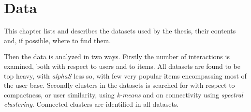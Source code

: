 
\chapter{Data}\label{cha:data}

This chapter lists and describes the datasets used by the thesis, their contents and, if possible, where to find them.

Then the data is analyzed in two ways. Firstly the number of interactions is examined, both with respect to users and to items. All datasets are found to be top heavy, with \textit{alphaS} less so, with few very popular items encompassing most of the user base. Secondly clusters in the datasets is searched for with respect to compactness, or user similarity, using \textit{k-means} and on connectivity using \textit{spectral clustering}. Connected clusters are identified in all datasets.





\newpage


